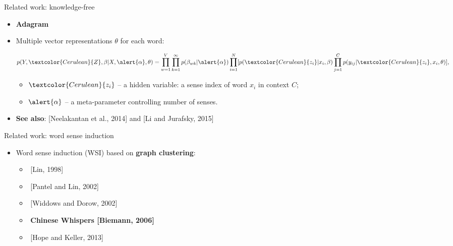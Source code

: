 \begin{frame}{Related work: knowledge-free}

\begin{itemize}
\item \textbf{Adagram}~\cite{bartunov2016breaking}
\item Multiple vector representations $\theta$ for each word:

\pause

 $$p(Y,\textcolor{Cerulean}{Z},\mathbf{\beta}|X,\alert{\alpha},\theta) = \prod_{w=1}^{V} \prod_{k=1}^{\infty} p(\beta_{wk}|\alert{\alpha}) \prod_{i=1}^N [p(\textcolor{Cerulean}{z_i}|x_i,\mathbf{\beta}) \prod_{j=1}^C p(y_{ij}|\textcolor{Cerulean}{z_i},x_i,\theta)],$$ 
\begin{itemize}
 
\item $\textcolor{Cerulean}{z_i}$ -- a hidden variable: a sense index of word $x_i$ in context $C$; 
\item $\alert{\alpha}$ -- a meta-parameter controlling number of senses.
\end{itemize}

\pause 
\item \alert{\textbf{See also}}: [Neelakantan et al., 2014] and [Li and Jurafsky, 2015]

\end{itemize}
	
\end{frame}


\begin{frame}{Related work: word sense induction}

\begin{itemize}
	\item Word sense induction (WSI) based on \alert{\textbf{graph clustering}}:  
	\begin{itemize}
	\item $ $ [Lin, 1998]
	\item $ $ [Pantel and Lin, 2002]
	\item $ $ [Widdows and Dorow, 2002]
	\item $ $ \textbf{Chinese Whispers [Biemann, 2006]}
	\item $ $ [Hope and Keller, 2013]
	\end{itemize}
	
\end{itemize}
	

\end{frame}



